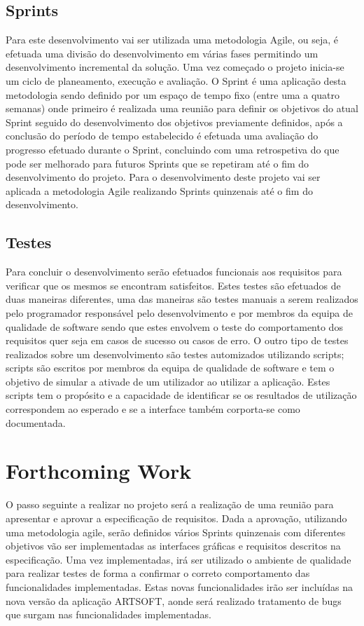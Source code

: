 \documentclass[sigplan]{acmart}
\begin{document}
\subsection{Sprints}

Para este desenvolvimento vai ser utilizada uma metodologia Agile, ou seja, é efetuada uma divisão do desenvolvimento em várias fases permitindo um desenvolvimento incremental da solução. Uma vez começado o projeto inicia-se um ciclo de planeamento, execução e avaliação. O Sprint é uma aplicação desta metodologia sendo definido por um espaço de tempo fixo (entre uma a quatro semanas) onde primeiro é realizada uma reunião para definir os objetivos do atual Sprint seguido do desenvolvimento dos objetivos previamente definidos, após a conclusão do período de tempo estabelecido é efetuada uma avaliação do progresso efetuado durante o Sprint, concluindo com uma retrospetiva do que pode ser melhorado para futuros Sprints que se repetiram até o fim do desenvolvimento do projeto. Para o desenvolvimento deste projeto vai ser aplicada a metodologia Agile realizando Sprints quinzenais até o fim do desenvolvimento.


\subsection{Testes}

Para concluir o desenvolvimento serão efetuados funcionais aos requisitos para verificar que os mesmos se encontram satisfeitos. Estes testes são efetuados de duas maneiras diferentes, uma das maneiras são testes manuais a serem realizados pelo programador responsável pelo desenvolvimento e por membros da equipa de qualidade de software sendo que estes envolvem o teste do comportamento dos requisitos quer seja em casos de sucesso ou casos de erro. O outro tipo de testes realizados sobre um desenvolvimento são testes automizados utilizando scripts; scripts são escritos por membros da equipa de qualidade de software e tem o objetivo de simular a ativade de um utilizador ao utilizar a aplicação. Estes scripts tem o propósito e a capacidade de identificar se os resultados de utilização correspondem ao esperado e se a interface também corporta-se como documentada.

\section{Forthcoming Work} \label{sec:forthcomingwork}

O passo seguinte a realizar no projeto será a realização de uma reunião para apresentar e aprovar a especificação de requisitos. Dada a aprovação, utilizando uma metodologia agile, serão definidos vários Sprints quinzenais com diferentes objetivos vão ser implementadas as interfaces gráficas e requisitos descritos na especificação. Uma vez implementadas, irá ser utilizado o ambiente de qualidade para realizar testes de forma a confirmar o correto comportamento das funcionalidades implementadas. Estas novas funcionalidades irão ser incluídas na nova versão da aplicação ARTSOFT, aonde será realizado tratamento de bugs que surgam nas funcionalidades implementadas.



\end{document}
